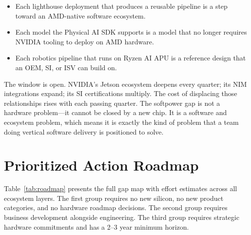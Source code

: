 \documentclass[blind]{gtac}
\begin{document}
\begin{itemize}
  \item Each lighthouse deployment that produces a reusable pipeline is a step toward an AMD-native software ecosystem.
  \item Each model the Physical AI SDK supports is a model that no longer requires NVIDIA tooling to deploy on AMD hardware.
  \item Each robotics pipeline that runs on Ryzen AI APU is a reference design that an OEM, SI, or ISV can build on.
\end{itemize}

The window is open. NVIDIA's Jetson ecosystem deepens every quarter; its NIM integrations expand; its SI certifications multiply. The cost of displacing those relationships rises with each passing quarter. The softpower gap is not a hardware problem---it cannot be closed by a new chip. It is a software and ecosystem problem, which means it is exactly the kind of problem that a team doing vertical software delivery is positioned to solve.

\section{Prioritized Action Roadmap}
\label{sec:roadmap}

Table~\ref{tab:roadmap} presents the full gap map with effort estimates across all ecosystem layers. The first group requires no new silicon, no new product categories, and no hardware roadmap decisions. The second group requires business development alongside engineering. The third group requires strategic hardware commitments and has a 2--3 year minimum horizon.
\end{document}
